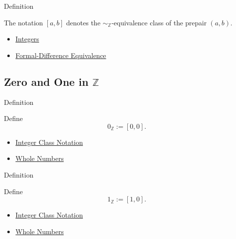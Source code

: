 \begin{definitionbox}{Definition}
\begin{definition}
\label{def:integer-class-notation}
The notation $[a,b]$ denotes the $\sim_{\mathbb{Z}}$-equivalence class of the
prepair $(a,b)$.
\end{definition}
\end{definitionbox}

\begin{dependencies}
\begin{itemize}
  \item \hyperref[def:integers]{Integers}
  \item \hyperref[def:formal-difference-equivalence]{Formal-Difference Equivalence}
\end{itemize}
\end{dependencies}

\subsection*{Zero and One in $\mathbb{Z}$}

\begin{definitionbox}{Definition}
\begin{definition}
\label{def:zero-in-z}
Define
\[
0_{\mathbb{Z}}:=[0,0].
\]
\end{definition}
\end{definitionbox}

\begin{dependencies}
\begin{itemize}
  \item \hyperref[def:integer-class-notation]{Integer Class Notation}
  \item \hyperref[def:whole-numbers]{Whole Numbers}
\end{itemize}
\end{dependencies}

\begin{definitionbox}{Definition}
\begin{definition}
\label{def:one-in-z}
Define
\[
1_{\mathbb{Z}}:=[1,0].
\]
\end{definition}
\end{definitionbox}

\begin{dependencies}
\begin{itemize}
  \item \hyperref[def:integer-class-notation]{Integer Class Notation}
  \item \hyperref[def:whole-numbers]{Whole Numbers}
\end{itemize}
\end{dependencies}

